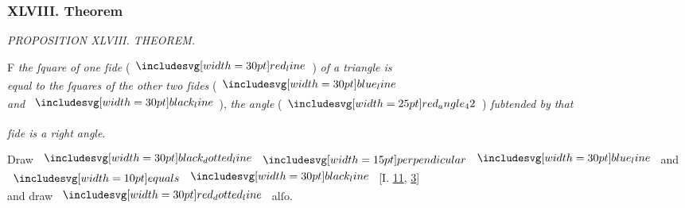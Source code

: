 \documentclass[12pt,preview]{standalone}
\begin{document}
\subsubsection{XLVIII. Theorem}

\begin{minipage}[t]{0.64\textwidth}
    \vspace{0pt}

    \begin{center}
        \textit{PROPOSITION XLVIII. THEOREM.}\label{book1pr48} \\
    \end{center}

    \hfill

    \begin{center}
        \raggedright \lettrine[lines=4, loversize=1, nindent=0pt]{}{}F \textit{the ſquare of one ſide} (\hspace{-1ex}$\redline$\hspace{-1ex}) \textit{of a triangle is\\ equal to the ſquares of the other two ſides} (\hspace{-1ex}$\blueline$\\ \textit{and} $\blackline$\hspace{-1ex}), \textit{the angle} (\hspace{-1ex}$\img{red_angle_42}$\hspace{-1ex}) \textit{ſubtended by that}\\
    \end{center}
    \textit{ſide is a right angle}.

    \hfill

    \hfill

    {\vspace{1ex}\begin{center}
            Draw $\dottedblackline \bperp \blueline$ and $\bequals \blackline$ [\textsc{I.} \hyperref[book1pr11]{11}, \hyperref[book1pr3]{3}]\\
            and draw $\dottedredline$ alſo.
        \end{center}}

    \hfill


\end{minipage}
\end{document}
